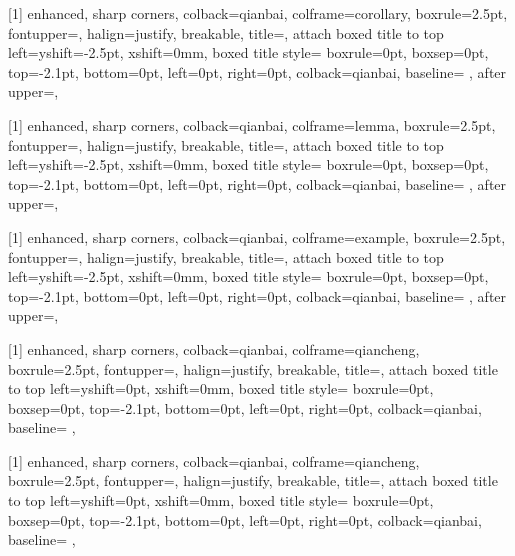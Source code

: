[1]{
	enhanced,
	sharp corners,
	colback=qianbai,
	colframe=corollary,
	boxrule=2.5pt,
	fontupper={\kaishu},
	halign=justify,
	breakable,
	title={},
	attach boxed title to top left={yshift=-2.5pt, xshift=0mm},
	boxed title style={
		boxrule=0pt,
		boxsep=0pt,
		top=-2.1pt,
		bottom=0pt,
		left=0pt,
		right=0pt,
		colback=qianbai,
		baseline=\ht\strutbox
	},
	after upper={\hfill\resizebox{!}{8pt}{\BoxCornerMark[corollary]}},
}

[1]{
	enhanced,
	sharp corners,
	colback=qianbai,
	colframe=lemma,
	boxrule=2.5pt,
	fontupper={\kaishu},
	halign=justify,
	breakable,
	title={},
	attach boxed title to top left={yshift=-2.5pt, xshift=0mm},
	boxed title style={
		boxrule=0pt,
		boxsep=0pt,
		top=-2.1pt,
		bottom=0pt,
		left=0pt,
		right=0pt,
		colback=qianbai,
		baseline=\ht\strutbox
	},
	after upper={\hfill\resizebox{!}{8pt}{\BoxCornerMark[lemma]}},
}

[1]{
	enhanced,
	sharp corners,
	colback=qianbai,
	colframe=example,
	boxrule=2.5pt,
	fontupper={\kaishu},
	halign=justify,
	breakable,
	title={},
	attach boxed title to top left={yshift=-2.5pt, xshift=0mm},
	boxed title style={
		boxrule=0pt,
		boxsep=0pt,
		top=-2.1pt,
		bottom=0pt,
		left=0pt,
		right=0pt,
		colback=qianbai,
		baseline=\ht\strutbox
	},
	after upper={\hfill\resizebox{!}{8pt}{\BoxCornerMark[example]}},
}

[1]{
	enhanced,
	sharp corners,
	colback=qianbai,
	colframe=qiancheng,
	boxrule=2.5pt,
	fontupper={\kaishu},
	halign=justify,
	breakable,
	title={},
	attach boxed title to top left={yshift=0pt, xshift=0mm},
	boxed title style={
		boxrule=0pt,
		boxsep=0pt,
		top=-2.1pt,
		bottom=0pt,
		left=0pt,
		right=0pt,
		colback=qianbai,
		baseline=\ht\strutbox
	},
}

[1]{
	enhanced,
	sharp corners,
	colback=qianbai,
	colframe=qiancheng,
	boxrule=2.5pt,
	fontupper={\kaishu},
	halign=justify,
	breakable,
	title={},
	attach boxed title to top left={yshift=0pt, xshift=0mm},
	boxed title style={
		boxrule=0pt,
		boxsep=0pt,
		top=-2.1pt,
		bottom=0pt,
		left=0pt,
		right=0pt,
		colback=qianbai,
		baseline=\ht\strutbox
	},
}

